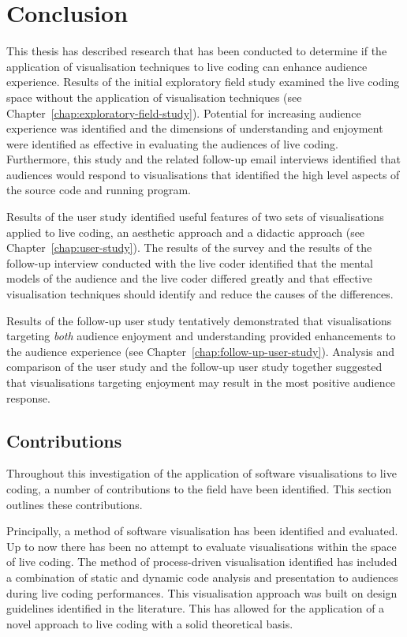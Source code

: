 
\chapter{Conclusion}
\label{chap:conclusion}

This thesis has described research that has been conducted to determine if the application of visualisation techniques to live coding can enhance audience experience. Results of the initial exploratory field study examined the live coding space without the application of visualisation techniques (see Chapter~\ref{chap:exploratory-field-study}). Potential for increasing audience experience was identified and the dimensions of understanding and enjoyment were identified as effective in evaluating the audiences of live coding. Furthermore, this study and the related follow-up email interviews identified that audiences would respond to visualisations that identified the high level aspects of the source code and running program.

Results of the user study identified useful features of two sets of visualisations applied to live coding, an aesthetic approach and a didactic approach (see Chapter~\ref{chap:user-study}). The results of the survey and the results of the follow-up interview conducted with the live coder identified that the mental models of the audience and the live coder differed greatly and that effective visualisation techniques should identify and reduce the causes of the differences.

Results of the follow-up user study tentatively demonstrated that visualisations targeting \textit{both} audience enjoyment and understanding provided enhancements to the audience experience (see Chapter~\ref{chap:follow-up-user-study}). Analysis and comparison of the user study and the follow-up user study together suggested that visualisations targeting enjoyment may result in the most positive audience response.

\section{Contributions}

Throughout this investigation of the application of software visualisations to live coding, a number of contributions to the field have been identified. This section outlines these contributions.

Principally, a method of software visualisation has been identified and evaluated. Up to now there has been no attempt to evaluate visualisations within the space of live coding. The method of process-driven visualisation identified has included a combination of static and dynamic code analysis and presentation to audiences during live coding performances. This visualisation approach was built on design guidelines identified in the literature. This has allowed for the application of a novel approach to live coding with a solid theoretical basis.



